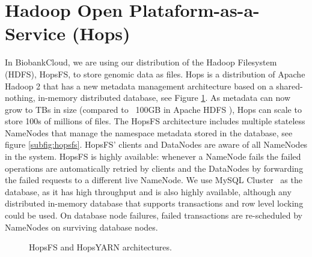 \section{Hadoop Open Plataform-as-a-Service (Hops)}
In BiobankCloud, we are using our distribution of the Hadoop Filesystem (HDFS), HopsFS, to store genomic data as files.  Hops is a distribution of Apache Hadoop 2 that has a new metadata management architecture based on a shared-nothing, in-memory distributed database, see Figure \ref{fig:hops}. As metadata can now grow to TBs in size (compared to  ~100GB in Apache HDFS \cite{shvachko2010Hdfs}), Hops can scale to store 100s of millions of files.
The HopsFS architecture includes multiple stateless NameNodes that manage the namespace metadata  stored in the database, see figure \ref{subfig:hopsfs}. HopsFS' clients and DataNodes are aware of all NameNodes in the system. HopsFS is  highly available: whenever a NameNode fails the failed operations are automatically retried by clients and the DataNodes by forwarding the failed requests to a different live NameNode. We use MySQL Cluster~\cite{ronstrom2005recovery} as the database, as it has high throughput and is also highly available, although any distributed in-memory database that supports transactions and row level locking could be used. On database node failures, failed transactions are re-scheduled by NameNodes on surviving database nodes.
\begin{figure}[!ht]
    \hfill
    \caption{HopsFS and HopsYARN architectures.}
    \label{fig:hops}
\end{figure}
  
